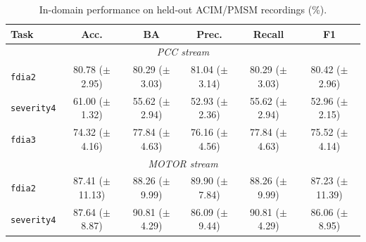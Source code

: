 \documentclass[letterpaper,journal]{IEEEtran}
\begin{document}
\begin{table}[p]
\begin{adjustbox}{max width=\textwidth,max totalheight=0.87\textheight}
\begin{minipage}{\textwidth}
\begin{minipage}[t]{0.48\textwidth}
\centering
\footnotesize
\caption{In-domain performance on held-out ACIM/PMSM recordings (\%).}
\label{tab:all_tasks_in_domain}
\renewcommand{\arraystretch}{1.15}
\setlength{\tabcolsep}{1.7pt}
\begin{tabular}{@{}lccccc@{}}
\hline
Task & Acc. & BA & Prec. & Recall & F1 \\\hline
\hline\multicolumn{6}{c}{\textit{PCC stream}} \\\hline
\texttt{fdia2} & \shortstack{80.78\\($\pm$2.95)} & \shortstack{80.29\\($\pm$3.03)} & \shortstack{81.04\\($\pm$3.14)} & \shortstack{80.29\\($\pm$3.03)} & \shortstack{80.42\\($\pm$2.96)} \\
\texttt{severity4} & \shortstack{61.00\\($\pm$1.32)} & \shortstack{55.62\\($\pm$2.94)} & \shortstack{52.93\\($\pm$2.36)} & \shortstack{55.62\\($\pm$2.94)} & \shortstack{52.96\\($\pm$2.15)} \\
\texttt{fdia3} & \shortstack{74.32\\($\pm$4.16)} & \shortstack{77.84\\($\pm$4.63)} & \shortstack{76.16\\($\pm$4.56)} & \shortstack{77.84\\($\pm$4.63)} & \shortstack{75.52\\($\pm$4.14)} \\
\hline\multicolumn{6}{c}{\textit{MOTOR stream}} \\\hline
\texttt{fdia2} & \shortstack{87.41\\($\pm$11.13)} & \shortstack{88.26\\($\pm$9.99)} & \shortstack{89.90\\($\pm$7.84)} & \shortstack{88.26\\($\pm$9.99)} & \shortstack{87.23\\($\pm$11.39)} \\
\texttt{severity4} & \shortstack{87.64\\($\pm$8.87)} & \shortstack{90.81\\($\pm$4.29)} & \shortstack{86.09\\($\pm$9.44)} & \shortstack{90.81\\($\pm$4.29)} & \shortstack{86.06\\($\pm$8.95)} \\

\end{tabular}
\end{minipage}
\end{minipage}
\end{adjustbox}
\end{table}
\end{document}
